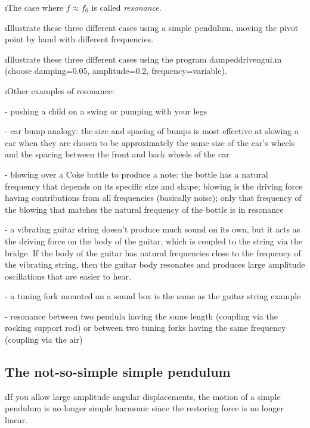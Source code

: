 \i The case where $f\approx f_0$ is called {\em resonance}.

\i \demo Illustrate these three different cases using
a simple pendulum, moving the pivot point by hand with 
different frequencies.

\i \demo Illustrate these three different cases using
the program dampeddrivengui.m
(choose damping=0.05, amplitude=0.2, frequency=variable).

\i Other examples of resonance:

- pushing a child on a swing or pumping with your legs 

- car bump analogy: the size and spacing of bumps is 
most effective at slowing a car when they are chosen 
to be approximately the same size of the car's wheels 
and the spacing between the front and back wheels of
the car

- blowing over a Coke bottle to produce a note:
the bottle has a natural frequency that depends on 
its specific size and shape;
blowing is the driving force having 
contributions from all frequencies (basically noise);
only that frequency of the blowing that matches 
the natural frequency of the bottle is in resonance

- a vibrating guitar string doesn't 
produce much sound on its own, but it acts as the 
driving force on the body of the guitar, which is 
coupled to the string via the bridge.
If the body of the guitar has natural frequencies 
close to the frequency of the 
vibrating string, then the guitar body resonates 
and produces large amplitude oscillations that are 
easier to hear.

- a tuning fork mounted on a sound box is the
same as the guitar string example

- resonance between two pendula having the same 
length (coupling via the rocking support rod) 
or between two tuning forks having 
the same frequency (coupling via the air)

\ei

\subsection{The not-so-simple simple pendulum}
\label{s:notsosimple}

\bi

\i If you allow large amplitude angular displacements,
the motion of a simple pendulum is no longer simple harmonic
since the restoring force is no longer linear.

